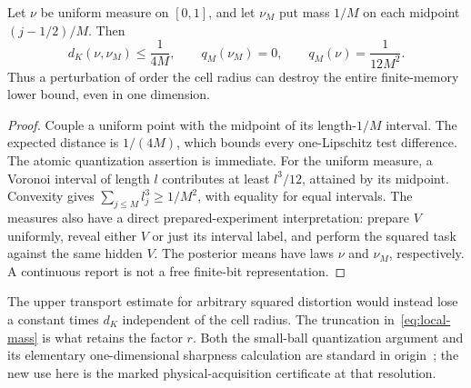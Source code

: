 \begin{proposition}\label{prop:resolution-sharp}
Let $\nu$ be uniform measure on $[0,1]$, and let $\nu_M$ put mass $1/M$ on each midpoint $(j-1/2)/M$. Then
\[
 d_K(\nu,\nu_M)\le\frac1{4M},\qquad
 q_M(\nu_M)=0,\qquad q_M(\nu)=\frac1{12M^2}.
\]
Thus a perturbation of order the cell radius can destroy the entire finite-memory lower bound, even in one dimension.
\end{proposition}
\begin{proof}
Couple a uniform point with the midpoint of its length-$1/M$ interval. The expected distance is $1/(4M)$, which bounds every one-Lipschitz test difference. The atomic quantization assertion is immediate. For the uniform measure, a Voronoi interval of length $l$ contributes at least $l^3/12$, attained by its midpoint. Convexity gives $\sum_{j\le M}l_j^3\ge1/M^2$, with equality for equal intervals. The measures also have a direct prepared-experiment interpretation: prepare $V$ uniformly, reveal either $V$ or just its interval label, and perform the squared task against the same hidden $V$. The posterior means have laws $\nu$ and $\nu_M$, respectively. A continuous report is not a free finite-bit representation.
\end{proof}
The upper transport estimate for arbitrary squared distortion would instead lose a constant times $d_K$ independent of the cell radius. The truncation in~\eqref{eq:local-mass} is what retains the factor $r$. Both the small-ball quantization argument and its elementary one-dimensional sharpness calculation are standard in origin~\cite{GrafLuschgy}; the new use here is the marked physical-acquisition certificate at that resolution.
